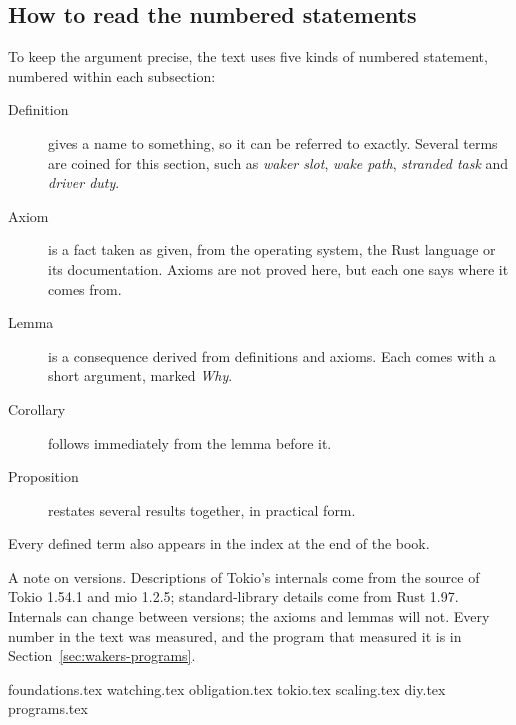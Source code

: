 \subsection*{How to read the numbered statements}

To keep the argument precise, the text uses five kinds of numbered statement, numbered within each subsection:

\begin{description}
    \item[Definition] gives a name to something, so it can be referred to exactly. Several terms are coined for this section, such as \emph{waker slot}, \emph{wake path}, \emph{stranded task} and \emph{driver duty}.
    \item[Axiom] is a fact taken as given, from the operating system, the Rust language or its documentation. Axioms are not proved here, but each one says where it comes from.
    \item[Lemma] is a consequence derived from definitions and axioms. Each comes with a short argument, marked \textit{Why}.
    \item[Corollary] follows immediately from the lemma before it.
    \item[Proposition] restates several results together, in practical form.
\end{description}

Every defined term also appears in the index at the end of the book.

\begin{alertbox}{A note on versions.}
    Descriptions of Tokio's internals come from the source of Tokio 1.54.1 and mio 1.2.5; standard-library details come from Rust 1.97. Internals can change between versions; the axioms and lemmas will not. Every number in the text was measured, and the program that measured it is in Section~\ref{sec:wakers-programs}.
\end{alertbox}

{foundations.tex}
{watching.tex}
{obligation.tex}
{tokio.tex}
{scaling.tex}
{diy.tex}
{programs.tex}

